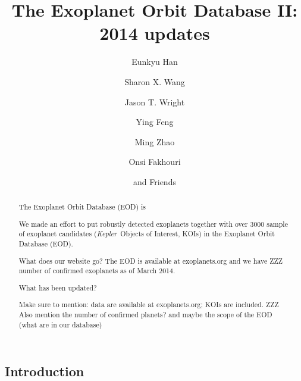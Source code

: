 \documentclass[11pt,preprint]{aastex}
\def\kepler{\textit{Kepler}}
\begin{document}
\begin{CJK*}{UTF8}{gbsn}

\title{The Exoplanet Orbit Database \textsc{II}: 2014 updates}

\author{Eunkyu Han}
\author{Sharon X. Wang}
\author{Jason T. Wright}
\author{Ying Feng}
\author{Ming Zhao}
\author{Onsi Fakhouri}
\author{and Friends}



\begin{abstract}
The Exoplanet Orbit Database (EOD) is 

We made an effort to put robustly detected exoplanets together with over 3000 sample of exoplanet candidates (\kepler\ Objects of Interest, KOIs) in the Exoplanet Orbit Database (EOD). 

What does our  website go?
The EOD is available at exoplanets.org and we have ZZZ number of confirmed exoplanets as of March 2014. 

What has been updated?



 Make sure to mention: data are available at exoplanets.org; KOIs are included.
ZZZ Also mention the number of confirmed planets? and maybe the scope of the EOD (what are in our database)


\end{abstract}  

\section{Introduction}\label{sec:intro}


\end{CJK*}
\end{document}
